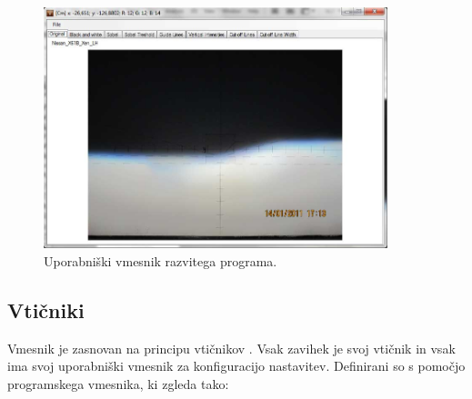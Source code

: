 \documentclass[oneside, a4paper, 12pt]{book}
\begin{document}
\begin{figure}
\begin{center}
\includegraphics[width=10cm]{slike/vmesnik-glavni.jpg}
\end{center}
\caption{Uporabniški vmesnik razvitega programa.}
\label{pic:vmesnik1}
\end{figure}

\subsection{Vtičniki}
Vmesnik je zasnovan na principu vtičnikov \cite{oreilly-dp, oreilly-cs}. Vsak zavihek je svoj vtičnik in vsak ima svoj uporabniški vmesnik za konfiguracijo nastavitev. Definirani so s pomočjo programskega vmesnika, ki zgleda tako:
\end{document}
